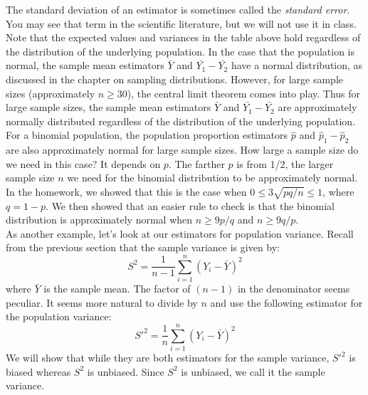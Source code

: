 \documentclass[12pt]{article}
\theoremstyle{definition}
\theoremstyle{remark}
\begin{document}
The standard deviation of an estimator is sometimes called the \emph{standard error}. You may see that term in the scientific literature, but we will not use it in class. Note that the expected values and variances in the table above hold regardless of the distribution of the underlying population. In the case that the population is normal, the sample mean estimators $\bar{Y}$ and $\bar{Y_1} - \bar{Y_2}$ have a normal distribution, as discussed in the chapter on sampling distributions. However, for large sample sizes (approximately $n \geq 30$), the central limit theorem comes into play. Thus for large sample sizes, the sample mean estimators $\bar{Y}$ and $\bar{Y_1} - \bar{Y_2}$ are approximately normally distributed regardless of the distribution of the underlying population. For a binomial population, the population proportion estimators $\hat{p}$ and $\hat{p}_1 - \hat{p}_2$ are also approximately normal for large sample sizes. How large a sample size do we need in this case? It depends on $p$. The farther $p$ is from 1/2, the larger sample size $n$ we need for the binomial distribution to be approximately normal. In the homework, we showed that this is the case when $0 \leq 3 \sqrt{pq/n} \leq 1$, where $q = 1 - p$. We then showed that an easier rule to check is that the binomial distribution is approximately normal when $n \geq 9p/q$ and $n \geq 9q/p$.\\

As another example, let's look at our estimators for population variance. Recall from the previous section that the sample variance is given by:
\[
S^2 = \frac{1}{n-1} \sum_{i=1}^n (Y_i - \bar{Y})^2
\]
where $\bar{Y}$ is the sample mean. The factor of $(n-1)$ in the denominator seems peculiar. It seems more natural to divide by $n$ and use the following estimator for the population variance:
\[
S'^2 = \frac{1}{n} \sum_{i=1}^n (Y_i - \bar{Y})^2
\]
We will show that while they are both estimators for the sample variance, $S'^2$ is biased whereas $S^2$ is unbiased. Since $S^2$ is unbiased, we call it the sample variance.\\
\end{document}
